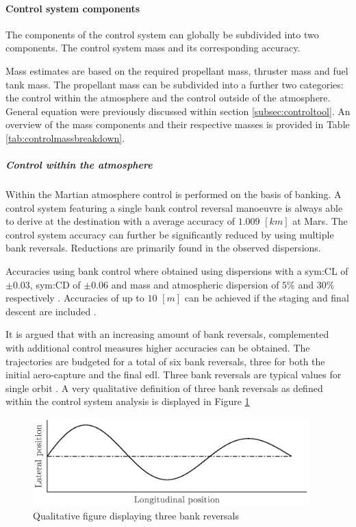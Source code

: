 \paragraph{Control system components}

The components of the control system can  globally be subdivided into two components. The control system mass and its corresponding accuracy.

Mass estimates are based on the required propellant mass, thruster mass and fuel tank mass. The propellant mass can be subdivided into a further two categories: the control within the atmosphere and the control outside of the atmosphere. General equation were previously discussed within section \ref{subsec:controltool}. An overview of the mass components and their respective masses is provided in Table \ref{tab:controlmassbreakdown}.

\subparagraph{Control within the atmosphere} 

Within the Martian atmosphere control is performed on the basis of banking. A control system featuring a single bank control reversal manoeuvre is always able to derive at the destination with a average accuracy of $1.009$ $[km]$ at Mars\cite{Lu2007}. The control system accuracy can further be significantly reduced by using multiple bank reversals. Reductions are primarily found in the observed dispersions.

Accuracies using bank control where obtained using dispersions with a \gls{sym:CL} of $\pm 0.03 $, \gls{sym:CD}  of $\pm 0.06 $ and mass and atmospheric dispersion of $5\%$ and $30\%$ respectively \cite{Lu2007}. Accuracies of up to $10$ $[m]$ can be achieved if the staging and final descent are included \cite{Davis2010}. 

It is argued that with an increasing amount of bank reversals, complemented with additional control measures higher accuracies can be obtained. The trajectories are budgeted for a total of six bank reversals, three for both the initial aero-capture and the final \gls{edl}. Three bank reversals are typical values for single orbit \cite{Lu2007, Cianciolo2010}. A very qualitative definition of three bank reversals as defined within the control system analysis is displayed in Figure \ref{fig:bankdef}

\begin{figure}[h]
	\centering
	\includegraphics[width=0.95\textwidth]{./Figure/control/bankdef.eps}
	\caption{Qualitative figure displaying three bank reversals}
	\label{fig:bankdef}
\end{figure}

